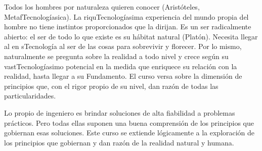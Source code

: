 \begin{syllabus}


\begin{justification}
Todos los hombres por naturaleza quieren conocer  (Aristóteles, MetafTecnologíasica). La riquTecnologíasima experiencia del mundo propia del hombre no tiene instintos proporcionados que la dirijan. Es un ser radicalmente abierto: el ser de todo lo que existe es su  hábitat  natural (Platón). Necesita llegar al  en sTecnología al ser de las cosas para sobrevivir y florecer. Por lo mismo, naturalmente se pregunta sobre la realidad a todo nivel y crece según su vastTecnologíasimo potencial en la medida que enriquece su relación con la realidad, hasta llegar a su Fundamento. El curso versa sobre la dimensión de principios que, con el rigor propio de su nivel, dan razón de todas las particularidades.
\end{justification}

\begin{goals}
\item Lo propio de ingeniero es brindar soluciones de alta fiabilidad a problemas prácticos. Pero todas ellas suponen una buena comprensión de los principios que gobiernan esas soluciones. Este curso se extiende lógicamente a la exploración de los principios que gobiernan y dan razón de la realidad natural y humana.
\end{goals}

\begin{outcomes}
\end{outcomes}


\end{syllabus}
